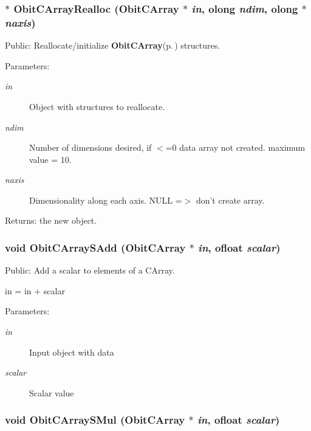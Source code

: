 \subsubsection{$\ast$ Obit\-CArray\-Realloc ({\bf Obit\-CArray} $\ast$ {\em in}, {\bf olong} {\em ndim}, {\bf olong} $\ast$ {\em naxis})}\label{ObitCArray_8h_a41}


Public: Reallocate/initialize {\bf Obit\-CArray}{\rm (p.\,\pageref{structObitCArray})} structures. 

\begin{Desc}
\item[Parameters:]
\begin{description}
\item[{\em in}]Object with structures to reallocate. \item[{\em ndim}]Number of dimensions desired, if $<$=0 data array not created. maximum value = 10. \item[{\em naxis}]Dimensionality along each axis. NULL =$>$ don't create array. \end{description}
\end{Desc}
\begin{Desc}
\item[Returns:]the new object. \end{Desc}
\subsubsection{\setlength{\rightskip}{0pt plus 5cm}void Obit\-CArray\-SAdd ({\bf Obit\-CArray} $\ast$ {\em in}, {\bf ofloat} {\em scalar})}\label{ObitCArray_8h_a48}


Public: Add a scalar to elements of a CArray. 

in = in + scalar \begin{Desc}
\item[Parameters:]
\begin{description}
\item[{\em in}]Input object with data \item[{\em scalar}]Scalar value \end{description}
\end{Desc}
\subsubsection{\setlength{\rightskip}{0pt plus 5cm}void Obit\-CArray\-SMul ({\bf Obit\-CArray} $\ast$ {\em in}, {\bf ofloat} {\em scalar})}\label{ObitCArray_8h_a49}


